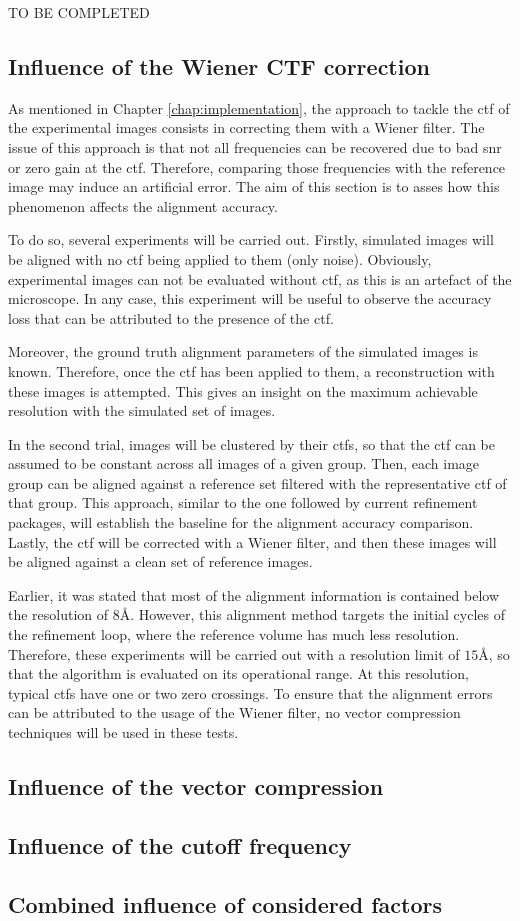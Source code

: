 \documentclass[../main.tex]{subfiles}
\begin{document}
TO BE COMPLETED

\subsection{Influence of the Wiener CTF correction}
As mentioned in Chapter \ref{chap:implementation}, the approach to tackle the \gls{ctf} of the experimental images consists in correcting them with a Wiener filter. The issue of this approach is that not all frequencies can be recovered due to bad \gls{snr} or zero gain at the \gls{ctf}. Therefore, comparing those frequencies with the reference image may induce an artificial error. The aim of this section is to asses how this phenomenon affects the alignment accuracy.

To do so, several experiments will be carried out. Firstly, simulated images will be aligned with no \gls{ctf} being applied to them (only noise). Obviously, experimental images can not be evaluated without \gls{ctf}, as this is an artefact of the microscope. In any case, this experiment will be useful to observe the accuracy loss that can be attributed to the presence of the \gls{ctf}. 

Moreover, the ground truth alignment parameters of the simulated images is known. Therefore, once the \gls{ctf} has been applied to them, a reconstruction with these images is attempted. This gives an insight on the maximum achievable resolution with the simulated set of images. 

In the second trial, images will be clustered by their \glspl{ctf}, so that the \gls{ctf} can be assumed to be constant across all images of a given group. Then, each image group can be aligned against a reference set filtered with the representative \gls{ctf} of that group. This approach, similar to the one followed by current refinement packages, will establish the baseline for the alignment accuracy comparison. Lastly, the \gls{ctf} will be corrected with a Wiener filter, and then these images will be aligned against a clean set of reference images. 

Earlier, it was stated that most of the alignment information is contained below the resolution of $8\si{\angstrom}$. However, this alignment method targets the initial cycles of the refinement loop, where the reference volume has much less resolution. Therefore, these experiments will be carried out with a resolution limit of $15\si{\angstrom}$, so that the algorithm is evaluated on its operational range. At this resolution, typical \glspl{ctf} have one or two zero crossings. To ensure that the alignment errors can be attributed to the usage of the Wiener filter, no vector compression techniques will be used in these tests.

\subsection{Influence of the vector compression}

\subsection{Influence of the cutoff frequency}

\subsection{Combined influence of considered factors}
\end{document}
